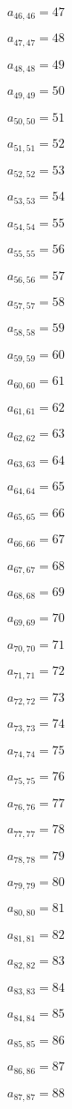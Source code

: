 \documentclass[a4paper,12pt]{article}
\begin{document}
$a _{ 46, 46 } = 47$

$a _{ 47, 47 } = 48$

$a _{ 48, 48 } = 49$

$a _{ 49, 49 } = 50$

$a _{ 50, 50 } = 51$

$a _{ 51, 51 } = 52$

$a _{ 52, 52 } = 53$

$a _{ 53, 53 } = 54$

$a _{ 54, 54 } = 55$

$a _{ 55, 55 } = 56$

$a _{ 56, 56 } = 57$

$a _{ 57, 57 } = 58$

$a _{ 58, 58 } = 59$

$a _{ 59, 59 } = 60$

$a _{ 60, 60 } = 61$

$a _{ 61, 61 } = 62$

$a _{ 62, 62 } = 63$

$a _{ 63, 63 } = 64$

$a _{ 64, 64 } = 65$

$a _{ 65, 65 } = 66$

$a _{ 66, 66 } = 67$

$a _{ 67, 67 } = 68$

$a _{ 68, 68 } = 69$

$a _{ 69, 69 } = 70$

$a _{ 70, 70 } = 71$

$a _{ 71, 71 } = 72$

$a _{ 72, 72 } = 73$

$a _{ 73, 73 } = 74$

$a _{ 74, 74 } = 75$

$a _{ 75, 75 } = 76$

$a _{ 76, 76 } = 77$

$a _{ 77, 77 } = 78$

$a _{ 78, 78 } = 79$

$a _{ 79, 79 } = 80$

$a _{ 80, 80 } = 81$

$a _{ 81, 81 } = 82$

$a _{ 82, 82 } = 83$

$a _{ 83, 83 } = 84$

$a _{ 84, 84 } = 85$

$a _{ 85, 85 } = 86$

$a _{ 86, 86 } = 87$

$a _{ 87, 87 } = 88$
\end{document}
